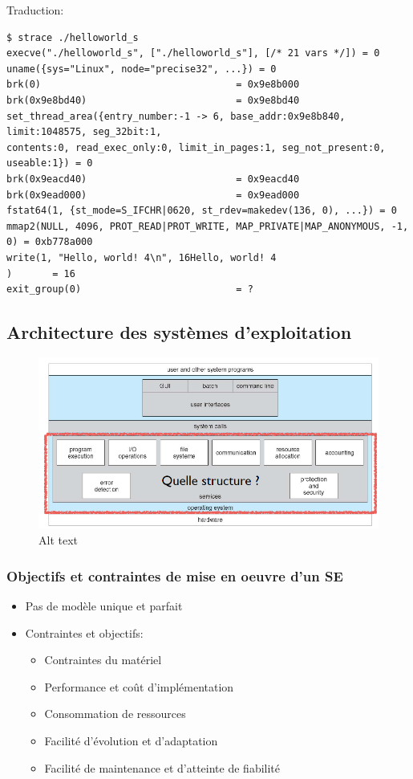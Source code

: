 Traduction:

\begin{verbatim}
$ strace ./helloworld_s
execve("./helloworld_s", ["./helloworld_s"], [/* 21 vars */]) = 0
uname({sys="Linux", node="precise32", ...}) = 0
brk(0)                                  = 0x9e8b000
brk(0x9e8bd40)                          = 0x9e8bd40
set_thread_area({entry_number:-1 -> 6, base_addr:0x9e8b840, limit:1048575, seg_32bit:1, 
contents:0, read_exec_only:0, limit_in_pages:1, seg_not_present:0, useable:1}) = 0
brk(0x9eacd40)                          = 0x9eacd40
brk(0x9ead000)                          = 0x9ead000
fstat64(1, {st_mode=S_IFCHR|0620, st_rdev=makedev(136, 0), ...}) = 0
mmap2(NULL, 4096, PROT_READ|PROT_WRITE, MAP_PRIVATE|MAP_ANONYMOUS, -1, 0) = 0xb778a000
write(1, "Hello, world! 4\n", 16Hello, world! 4
)       = 16
exit_group(0)                           = ?
\end{verbatim}

\subsection{Architecture des systèmes
d'exploitation}\label{architecture-des-systuxe8mes-dexploitation}

\begin{figure}
\centering
\includegraphics{image-15.png}
\caption{Alt text}
\end{figure}

\subsubsection{Objectifs et contraintes de mise en oeuvre d'un
SE}\label{objectifs-et-contraintes-de-mise-en-oeuvre-dun-se}

\begin{itemize}
\tightlist
\item
  Pas de modèle unique et parfait
\item
  Contraintes et objectifs:

  \begin{itemize}
  \tightlist
  \item
    Contraintes du matériel
  \item
    Performance et coût d'implémentation
  \item
    Consommation de ressources
  \item
    Facilité d'évolution et d'adaptation
  \item
    Facilité de maintenance et d'atteinte de fiabilité
  \end{itemize}
\end{itemize}

